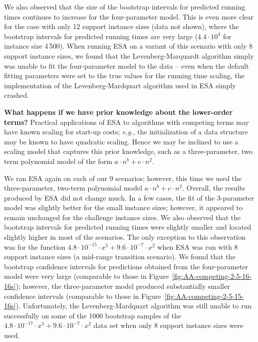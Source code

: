 \documentclass[aic]{iosart2x}
\newcommand{\eg}{\emph{e.g.}}
\begin{document}
We also observed that the size of the bootstrap intervals for predicted running times continues to increase for the four-parameter model. This is even more clear for the case with only 12 support instance sizes (data not shown), where the bootstrap intervals for predicted running times are very large ($4.4\cdot 10^4$ for instance size 4\,500). 
When running ESA on a variant of this scenario with only 8 support instance sizes, we found that the Levenberg-Marquardt algorithm simply was unable to fit the four-parameter model to the data -- even when the default fitting parameters were set to the true values for the running time scaling, the implementation of the Levenberg-Mardquart algorithm used in ESA simply crashed. 

\textbf{What happens if we have prior knowledge about the lower-order terms?}
Practical applications of ESA to algorithms with competing terms may have known scaling for start-up costs; \eg{}, the initialization of a data structure may be known to have quadratic scaling. 
Hence we may be inclined to use a scaling model that captures this prior knowledge, such as a three-parameter, two term polynomial model of the form $a\cdot n^b + c\cdot n^2$. 

We ran ESA again on each of our 9 scenarios; however, this time we used the three-parameter, two-term polynomial model $a\cdot n^b + c\cdot n^2$. 
Overall, the results produced by ESA did not change much. 
In a few cases, the fit of the 3-parameter model was slightly better for the small instance sizes; however, it appeared to remain unchanged for the challenge instance sizes. 
We also observed that the bootstrap intervals for predicted running times were slightly smaller and located slightly higher in most of the scenarios. 
The only exception to this observation was for the function $4.8\cdot 10^{-15} \cdot x^5 + 9.6\cdot 10^{-7} \cdot x^2$ when ESA was run with 8 support instance sizes  (a mid-range transition scenario).
We found that the bootstrap confidence intervals for predictions obtained from the four-parameter model were very large (comparable to those in Figure~\ref{fig:AA-competing-2-5-16-16s}); however, the three-parameter model produced substantially smaller confidence intervals (comparable to those in Figure~\ref{fig:AA-competing-2-5-15-16s}). 
Unfortunately, the Levenberg-Mardquart algorithm was still unable to run successfully on some of the 1000 bootstrap samples of the $4.8\cdot 10^{-17} \cdot x^5+ 9.6\cdot 10^{-7} \cdot x^2$ data set when only 8 support instance sizes were used. 
\end{document}
